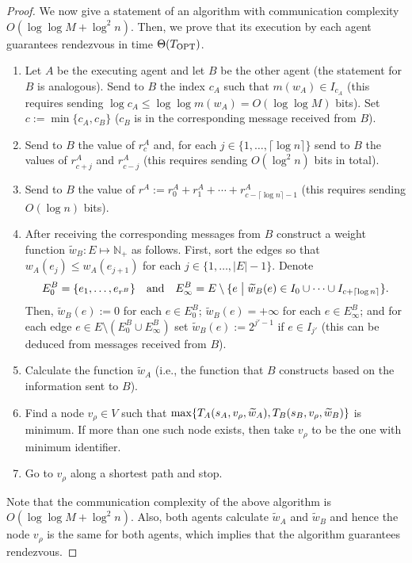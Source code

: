 \documentclass{llncs}
\newcommand{\Topts}{T_{\scriptsize \textup{OPT}}}
\newcommand{\dist}[4][]{\if!#1!T_{#2}(#3,#4)\else T_{#2}(#3,#4,#1)\fi}
\newcommand{\startpos}[1]{s_{#1}}
\newcommand{\nat}{\mathbb{N}_{+}}
\newcommand{\st}{\hspace{0.1cm}\bigl|\bigr.\hspace{0.1cm}}
\begin{document}
\begin{proof}
We now give a statement of an algorithm with communication complexity $O(\log\log M+\log^2n)$.
Then, we prove that its execution by each agent guarantees rendezvous in time $\Theta(\Topts)$.
\begin{enumerate}
 \item Let $A$ be the executing agent and let $B$ be the other agent (the statement for $B$ is analogous).
  Send to $B$ the index $c_A$ such that $m(w_A)\in I_{c_A}$ (this requires sending $\log c_A\leq\log\log m(w_A)=O(\log\log M)$ bits).
  Set $c:=\min\{c_A,c_{B}\}$ ($c_{B}$ is in the corresponding message received from $B$).
 \item Send to $B$ the value of $r^A_{c}$ and, for each $j\in\{1,\ldots,\lceil\log n\rceil\}$ send to $B$ the values of $r^A_{c+j}$ and $r^A_{c-j}$ (this requires sending $O(\log^2n)$ bits in total).
 \item Send to $B$ the value of $r^A:=r^A_0+r^A_1+\cdots+r^A_{c-\lceil\log n\rceil-1}$ (this requires sending $O(\log n)$ bits).
 \item After receiving the corresponding messages from $B$
  construct a weight function $\widetilde{w}_{B}\colon E \mapsto \nat$ as follows.
  First, sort the edges so that $w_A(e_j)\leq w_A(e_{j+1})$ for each $j\in\{1,\ldots,|E|-1\}$.
  Denote
   \[E_0^{B}=\{e_1,\ldots,e_{r^{B}}\} \quad\textup{and}\quad E_{\infty}^{B}=E\setminus\{e\st \widetilde{w}_{B}(e)\in I_{0}\cup\cdots\cup I_{c+\lceil\log n\rceil}\}.\]
  Then, $\widetilde{w}_{B}(e):=0$ for each $e\in E_0^{B}$; $\widetilde{w}_{B}(e)=+\infty$ for each $e\in E_{\infty}^{B}$; and for each edge $e\in E\setminus(E_0^B\cup E_{\infty}^B)$ set
  $\widetilde{w}_{B}(e):=2^{j'-1}$ if $e\in I_{j'}$ (this can be deduced from messages received from $B$).
 \item Calculate the function $\widetilde{w}_{A}$ (i.e., the function that $B$ constructs based on the information sent to $B$).
 \item Find a node $v_{\rho}\in V$ such that $\max\{\dist[\widetilde{w}_{A}]{A}{\startpos{A}}{v_{\rho}},\dist[\widetilde{w}_{B}]{B}{\startpos{B}}{v_{\rho}}\}$ is minimum.
  If more than one such node exists, then take $v_{\rho}$ to be the one with minimum identifier.
 \item Go to $v_{\rho}$ along a shortest path and stop.
\end{enumerate}
Note that the communication complexity of the above algorithm is $O(\log\log M+\log^2n)$.
Also, both agents calculate $\widetilde{w}_{A}$ and $\widetilde{w}_{B}$ and hence the node $v_{\rho}$ is the same for both agents, which implies that the algorithm guarantees rendezvous.


\end{proof}
\end{document}
